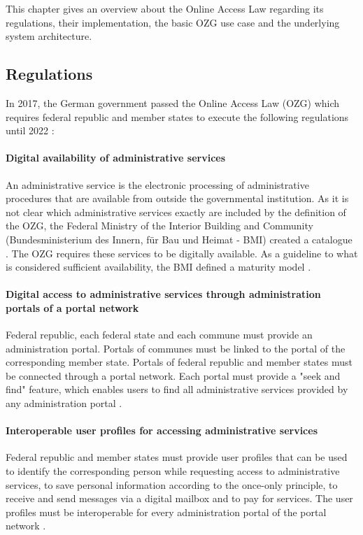 This chapter gives an overview about the Online Access Law regarding its regulations, their implementation, the basic OZG use case and the underlying system architecture.

\subsection{Regulations}

In 2017, the German government passed the Online Access Law (OZG) which requires federal republic and member states to execute the following regulations until 2022 \cite{ozg:regulations}:

\paragraph{Digital availability of administrative services} An administrative service is the electronic processing of administrative procedures that are available from outside the governmental institution.  As it is not clear which administrative services exactly are included by the definition of the OZG, the Federal Ministry of the Interior Building and Community (Bundesministerium des Innern, für Bau und Heimat - BMI) created a catalogue \cite{ozg:informationsplattform}. The OZG requires these services to be digitally available. As a guideline to what is considered sufficient availability, the BMI defined a maturity model \cite{ozg:maturity_model}.

\paragraph{Digital access to administrative services through administration portals of a portal network} Federal republic, each federal state and each commune must provide an administration portal. Portals of communes must be linked to the portal of the corresponding member state. Portals of federal republic and member states must be connected through a portal network. \cite{ozg:onlinegateway_general} Each portal must provide a "seek and find" feature, which enables users to find all administrative services provided by any administration portal \cite{ozg:onlinegateway_architecture}. 

\paragraph{Interoperable user profiles for accessing administrative services} Federal republic and member states must provide user profiles that can be used to identify the corresponding person while requesting access to administrative services, to save personal information according to the once-only principle, to receive and send messages via a digital mailbox and to pay for services. The user profiles must be interoperable for every administration portal of the portal network \cite{ozg:user_profiles_general}.

